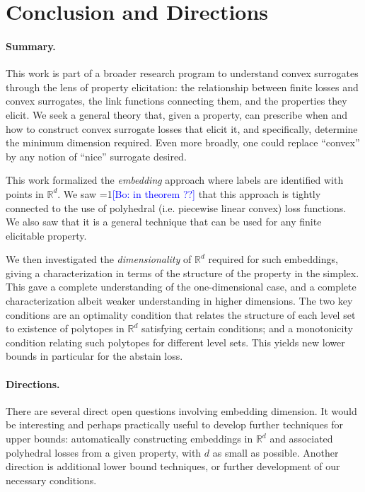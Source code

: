 \documentclass[11pt]{colt2019}
\newcommand{\Comments}{1}
\newcommand{\mynote}[2]{\ifnum\Comments=1\textcolor{#1}{#2}\fi}
\newcommand{\bo}[1]{\mynote{blue}{[Bo: #1]}}
\newcommand{\reals}{\mathbb{R}}
\begin{document}
\section{Conclusion and Directions}  \label{sec:conclusion}
\paragraph{Summary.}
This work is part of a broader research program to understand convex surrogates through the lens of property elicitation: the relationship between finite losses and convex surrogates, the link functions connecting them, and the properties they elicit.
We seek a general theory that, given a property, can prescribe when and how to construct convex surrogate losses that elicit it, and specifically, determine the minimum dimension required.
Even more broadly, one could replace ``convex'' by any notion of ``nice'' surrogate desired.

This work formalized the \emph{embedding} approach where labels are identified with points in $\reals^d$.
We saw \bo{in theorem ??} that this approach is tightly connected to the use of polyhedral (i.e. piecewise linear convex) loss functions.
We also saw that it is a general technique that can be used for any finite elicitable property.

We then investigated the \emph{dimensionality} of $\reals^d$ required for such embeddings, giving a characterization in terms of the structure of the property in the simplex.
This gave a complete understanding of the one-dimensional case, and a complete characterization albeit weaker understanding in higher dimensions.
The two key conditions are an optimality condition that relates the structure of each level set to existence of polytopes in $\reals^d$ satisfying certain conditions; and a monotonicity condition relating such polytopes for different level sets.
This yields new lower bounds in particular for the abstain loss.

\paragraph{Directions.}
There are several direct open questions involving embedding dimension.
It would be interesting and perhaps practically useful to develop further techniques for upper bounds: automatically constructing embeddings in $\reals^d$ and associated polyhedral losses from a given property, with $d$ as small as possible.
Another direction is additional lower bound techniques, or further development of our necessary conditions.
\end{document}
